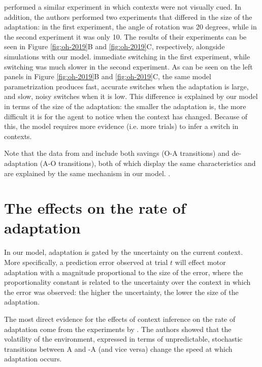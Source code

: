 \documentclass[a4paper,doc,floatsintext,natbib]{apa6}
\def \fref #1{Figure \ref{#1}}     %
\begin{document}
\cite{Oh_Minimizing_2019} performed a similar experiment in which contexts were not visually cued. In addition, the authors performed two experiments that differed in the size of the adaptation: in the first experiment, the angle of rotation was 20 degrees, while in the second experiment it was only 10. The results of their experiments can be seen in \fref{fig:oh-2019}B and \ref{fig:oh-2019}C, respectively, alongside simulations with our model. \cite{Oh_Minimizing_2019} immediate switching in the first experiment, while switching was much slower in the second experiment. As can be seen on the left panels in \fref{fig:oh-2019}B and \ref{fig:oh-2019}C, the same model parametrization produces fast, accurate switches when the adaptation is large, and slow, noisy switches when it is low. This difference is explained by our model in terms of the size of the adaptation: the smaller the adaptation is, the more difficult it is for the agent to notice when the context has changed. Because of this, the model requires more evidence (i.e. more trials) to infer a switch in contexts.

Note that the data from \cite{Oh_Minimizing_2019} and \cite{Kim_Neural_2015} include both savings (O-A transitions) and de-adaptation (A-O transitions), both of which display the same characteristics and are explained by the same mechanism in our model. .


\section{The effects on the rate of adaptation}
In our model, adaptation is gated by the uncertainty on the current context. More specifically, a prediction error observed at trial $t$ will effect motor adaptation with a magnitude proportional to the size of the error, where the proportionality constant is related to the uncertainty over the context in which the error was observed: the higher the uncertainty, the lower the size of the adaptation.

The most direct evidence for the effects of context inference on the rate of adaptation come from the experiments by \cite{Herzfeld_memory_2014}. The authors showed that the volatility of the environment, expressed in terms of unpredictable, stochastic transitions between A and -A (and vice versa) change the speed at which adaptation occurs.
\end{document}
